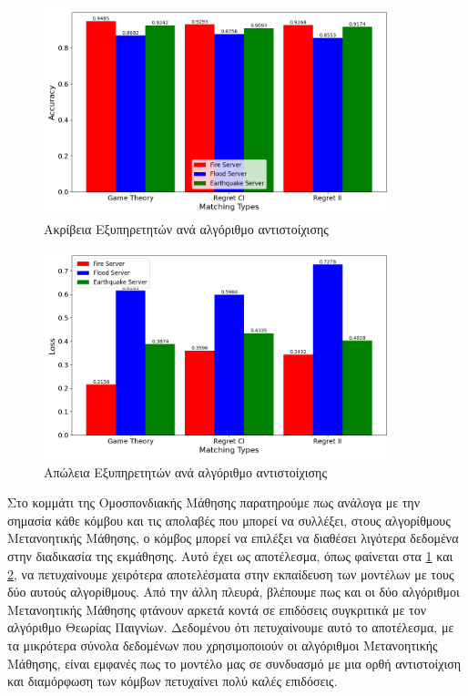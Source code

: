 \begin{figure}[H]
    \centering
    \includegraphics[width=0.9\textwidth]{figures/chapter4/accuracy_plot.png}
    \caption{Ακρίβεια Εξυπηρετητών ανά αλγόριθμο αντιστοίχισης}
    \label{fig31}
\end{figure}

\begin{figure}[H]
    \centering
    \includegraphics[width=0.9\textwidth]{figures/chapter4/loss_plot.png}
    \caption{Απώλεια Εξυπηρετητών ανά αλγόριθμο αντιστοίχισης}
    \label{fig32}
\end{figure}

\newpage

Στο κομμάτι της Ομοσπονδιακής Μάθησης παρατηρούμε πως ανάλογα με την σημασία κάθε κόμβου και τις απολαβές που μπορεί να συλλέξει, στους αλγορίθμους Μετανοητικής Μάθησης, ο κόμβος μπορεί να επιλέξει να διαθέσει λιγότερα δεδομένα στην διαδικασία της εκμάθησης. Αυτό έχει ως αποτέλεσμα, όπως φαίνεται στα \ref{fig31} και \ref{fig32}, να πετυχαίνουμε χειρότερα αποτελέσματα στην εκπαίδευση των μοντέλων με τους δύο αυτούς αλγορίθμους. Από την άλλη πλευρά, βλέπουμε πως και οι δύο αλγόριθμοι Μετανοητικής Μάθησης φτάνουν αρκετά κοντά σε επιδόσεις συγκριτικά με τον αλγόριθμο Θεωρίας Παιγνίων. Δεδομένου ότι πετυχαίνουμε αυτό το αποτέλεσμα, με τα μικρότερα σύνολα δεδομένων που χρησιμοποιούν οι αλγόριθμοι Μετανοητικής Μάθησης, είναι εμφανές πως το μοντέλο μας σε συνδυασμό με μια ορθή αντιστοίχιση και διαμόρφωση των κόμβων πετυχαίνει πολύ καλές επιδόσεις.

